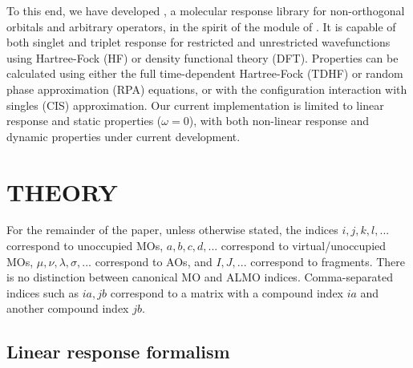 \documentclass[%
  class = book,%
  crop = false,%
  float = true,%
  multi = true,%
  preview = false,%
]{standalone}
\let\cite\autocite
\newcommand{\caps}[1]{\uppercase{#1}}
\begin{document}
To this end, we have developed \libresponse{}, a molecular response library for non-orthogonal orbitals and arbitrary operators, in the spirit of the \response{} module of \pdalton{}\cite{daltonpaper}. It is capable of both singlet\cite{doi:10.1063/1.454885} and triplet\cite{doi:10.1063/1.457471} response for restricted and unrestricted wavefunctions using Hartree-Fock (HF) or density functional theory (DFT). Properties can be calculated using either the full time-dependent Hartree-Fock (TDHF) or random phase approximation (RPA) equations, or with the configuration interaction with singles (CIS) approximation\cite{doi:10.1021/j100180a030}. Our current implementation is limited to linear response and static properties (\(\omega = 0\)), with both non-linear response and dynamic properties under current development.

\section{\texorpdfstring{\caps{Theory}}{Theory}}
\label{sec:theory}

For the remainder of the paper, unless otherwise stated, the indices \(i,j,k,l,...\) correspond to unoccupied MOs, \(a,b,c,d,...\) correspond to virtual/unoccupied MOs, \(\mu,\nu,\lambda,\sigma,...\) correspond to AOs, and \(I,J,...\) correspond to fragments. There is no distinction between canonical MO and ALMO indices. Comma-separated indices such as \(ia,jb\) correspond to a matrix with a compound index \(ia\) and another compound index \(jb\).

\subsection{Linear response formalism}
\label{ssec:linear-response-formalism}
\end{document}
